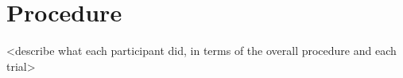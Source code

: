 \section{Procedure}
<describe what each participant did, in terms of the overall procedure and each trial>

